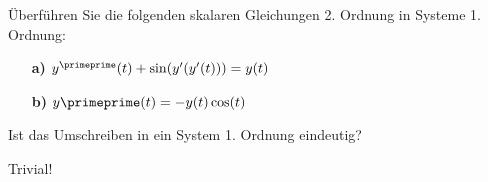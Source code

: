 \begin{exercise}

Überführen Sie die folgenden skalaren Gleichungen 2. Ordnung in Systeme 1. Ordnung:

\begin{itemize}

  \item[\textbf{a)}] $y^\primeprime(t) + \sin(y^\prime(y^\prime(t))) = y(t)$

  \item[\textbf{b)}] $y\primeprime(t) = -y(t) \cos(t)$

\end{itemize}

Ist das Umschreiben in ein System 1. Ordnung eindeutig?

\end{exercise}

\begin{solution}

Trivial!

\end{solution}
